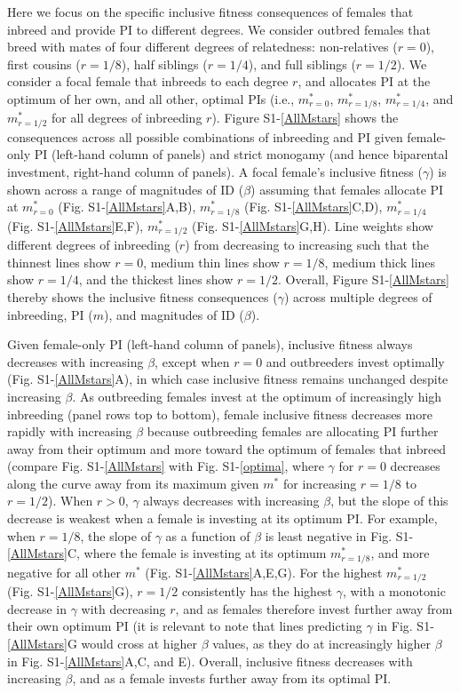 \documentclass[12pt]{article}
\begin{document}
Here we focus on the specific inclusive fitness consequences of females that inbreed and provide PI to different degrees. We consider outbred females that breed with mates of four different degrees of relatedness: non-relatives ($r=0$), first cousins ($r=1/8$), half siblings ($r=1/4$), and full siblings ($r=1/2$). We consider a focal female that inbreeds to each degree $r$, and allocates PI at the optimum of her own, and all other, optimal PIs (i.e., $m^{*}_{r=0}$, $m^{*}_{r=1/8}$, $m^{*}_{r=1/4}$, and $m^{*}_{r=1/2}$ for all degrees of inbreeding $r$). Figure S1-\ref{AllMstars} shows the consequences across all possible combinations of inbreeding and PI given female-only PI (left-hand column of panels) and strict monogamy (and hence biparental investment, right-hand column of panels). A focal female's inclusive fitness ($\gamma$) is shown across a range of magnitudes of ID ($\beta$) assuming that females allocate PI at $m^{*}_{r=0}$ (Fig. S1-\ref{AllMstars}A,B), $m^{*}_{r=1/8}$ (Fig. S1-\ref{AllMstars}C,D), $m^{*}_{r=1/4}$ (Fig. S1-\ref{AllMstars}E,F), $m^{*}_{r=1/2}$ (Fig. S1-\ref{AllMstars}G,H). Line weights show different degrees of inbreeding ($r$) from decreasing to increasing such that the thinnest lines show $r=0$, medium thin lines show $r=1/8$, medium thick lines show $r=1/4$, and the thickest lines show $r=1/2$. Overall, Figure S1-\ref{AllMstars} thereby shows the inclusive fitness consequences ($\gamma$) across multiple degrees of inbreeding, PI ($m$), and magnitudes of ID ($\beta$).

Given female-only PI (left-hand column of panels), inclusive fitness always decreases with increasing $\beta$, except when $r=0$ and outbreeders invest optimally (Fig. S1-\ref{AllMstars}A), in which case inclusive fitness remains unchanged despite increasing $\beta$. As outbreeding females invest at the optimum of increasingly high inbreeding (panel rows top to bottom), female inclusive fitness decreases more rapidly with increasing $\beta$ because outbreeding females are allocating PI further away from their optimum and more toward the optimum of females that inbreed (compare Fig. S1-\ref{AllMstars} with Fig. S1-\ref{optima}, where $\gamma$ for $r=0$ decreases along the curve away from its maximum given $m^{*}$ for increasing $r=1/8$ to $r=1/2$). When $r>0$, $\gamma$ always decreases with increasing $\beta$, but the slope of this decrease is weakest when a female is investing at its optimum PI. For example, when $r=1/8$, the slope of $\gamma$ as a function of $\beta$ is least negative in Fig. S1-\ref{AllMstars}C, where the female is investing at its optimum $m^{*}_{r=1/8}$, and more negative for all other $m^{*}$ (Fig. S1-\ref{AllMstars}A,E,G). For the highest $m^{*}_{r=1/2}$ (Fig. S1-\ref{AllMstars}G), $r=1/2$ consistently has the highest $\gamma$, with a monotonic decrease in $\gamma$ with decreasing $r$, and as females therefore invest further away from their own optimum PI (it is relevant to note that lines predicting $\gamma$ in Fig. S1-\ref{AllMstars}G would cross at higher $\beta$ values, as they do at increasingly higher $\beta$ in Fig. S1-\ref{AllMstars}A,C, and E). Overall, inclusive fitness decreases with increasing $\beta$, and as a female invests further away from its optimal PI.
\end{document}
